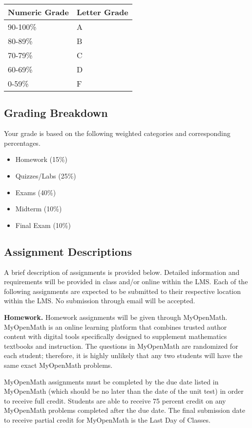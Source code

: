 \documentclass{article}
\begin{document}
\bigskip\noindent
\begin{tabular}{p{}p{}}
\toprule
Numeric Grade & Letter Grade \\
\hline
90-100\% & A \\
80-89\% & B \\
70-79\% & C \\
60-69\% & D \\
0-59\% & F \\
\bottomrule
\end{tabular}

\bigskip\subsection{Grading Breakdown}

Your grade is based on the following weighted categories and corresponding percentages.

\begin{itemize}
\item Homework (15\%)
\item Quizzes/Labs (25\%)
\item Exams (40\%)
\item Midterm (10\%)
\item Final Exam (10\%)
\end{itemize}

\subsection{Assignment Descriptions}

A brief description of assignments is provided below. Detailed information and requirements will be provided in class and/or online within the LMS. Each of the following assignments are expected to be submitted to their respective location within the LMS. No submission through email will be accepted.

\textbf{Homework.} Homework assignments will be given through MyOpenMath. MyOpenMath is an online learning platform that combines trusted author content with digital tools specifically designed to supplement mathematics textbooks and instruction. The questions in MyOpenMath are randomized for each student; therefore, it is highly unlikely that any two students will have the same exact MyOpenMath problems.

MyOpenMath assignments must be completed by the due date listed in MyOpenMath (which should be no later than the date of the unit test) in order to receive full credit. Students are able to receive 75 percent credit on any MyOpenMath problems completed after the due date. The final submission date to receive partial credit for MyOpenMath is the Last Day of Classes.
\end{document}
